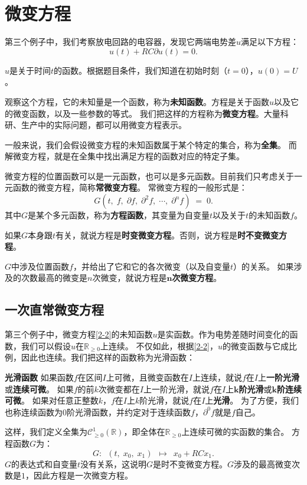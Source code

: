 \documentclass[12pt,UTF8]{ctexbook}
\begin{document}
\section{微变方程}

第三个例子中，我们考察放电回路的电容器，发现它两端电势差$u$满足以下方程：
\begin{equation}
    u(t) + RC\partial  u(t) = 0. \label{2-2}
\end{equation}

$u$是关于时间$t$的函数。根据题目条件，我们知道在初始时刻（$t=0$），$u(0) = U$。

观察这个方程，它的未知量是一个函数，称为\textbf{未知函数}。方程是关于函数$u$以及它的微变函数，以及一些参数的等式。
我们把这样的方程称为\textbf{微变方程}。大量科研、生产中的实际问题，都可以用微变方程表示。

一般来说，我们会假设微变方程的未知函数属于某个特定的集合，称为\textbf{全集}。
而解微变方程，就是在全集中找出满足方程的函数对应的特定子集。

微变方程的位置函数可以是一元函数，也可以是多元函数。目前我们只考虑关于一元函数的微变方程，简称\textbf{常微变方程}。
常微变方程的一般形式是：
$$ G(t, \; f, \; \partial f, \; \partial^2 f, \; \cdots , \; \partial^n f)\;  =\;  0.$$
其中$G$是某个多元函数，称为\textbf{方程函数}，其变量为自变量$t$以及关于$t$的未知函数$f$。

如果$G$本身跟$t$有关，就说方程是\textbf{时变微变方程}。否则，说方程是\textbf{时不变微变方程}。

$G$中涉及位置函数$f$，并给出了它和它的各次微变（以及自变量$t$）的关系。
如果涉及的次数最高的微变是$n$次微变，就说方程是$\boldsymbol{n}$\textbf{次微变方程}。

\subsection{一次直常微变方程}
第三个例子中，微变方程\eqref{2-2}的未知函数$u$是实函数。作为电势差随时间变化的函数，我们可以假设$u$在$\mathbb{R}_{\geqslant 0}$上连续。
不仅如此，根据\eqref{2-2}，$u$的微变函数与它成比例，因此也连续。我们把这样的函数称为光滑函数：
\begin{df}{\textbf{光滑函数}}
    如果函数$f$在区间$I$上可微，且微变函数在$I$上连续，就说$f$在$I$上\textbf{一阶光滑}或\textbf{连续可微}。
    如果$f$的前$k$次微变都在$I$上一阶光滑，就说$f$在$I$上$\boldsymbol{k}$\textbf{阶光滑}或$\boldsymbol{k}$\textbf{阶连续可微}。
    如果对任意正整数$k$，$f$在$I$上$k$阶光滑，就说$f$在$I$上\textbf{光滑}。
    为了方便，我们也称连续函数为$0$阶光滑函数，并约定对于连续函数$f$，$\partial^0 f$就是$f$自己。
\end{df}
这样，我们定义全集为$\mathcal{C}^1_{\geqslant 0}(\mathbb{R})$，即全体在$\mathbb{R}_{\geqslant 0}$上连续可微的实函数的集合。
方程函数$G$为：
$$ G: \,\,\,(t, \; x_0, \; x_1) \,\,\, \mapsto \,\,\, x_0 + RC x_1. $$
$G$的表达式和自变量$t$没有关系，这说明$G$是时不变微变方程。$G$涉及的最高微变次数是$1$，因此方程是一次微变方程。
\end{document}
